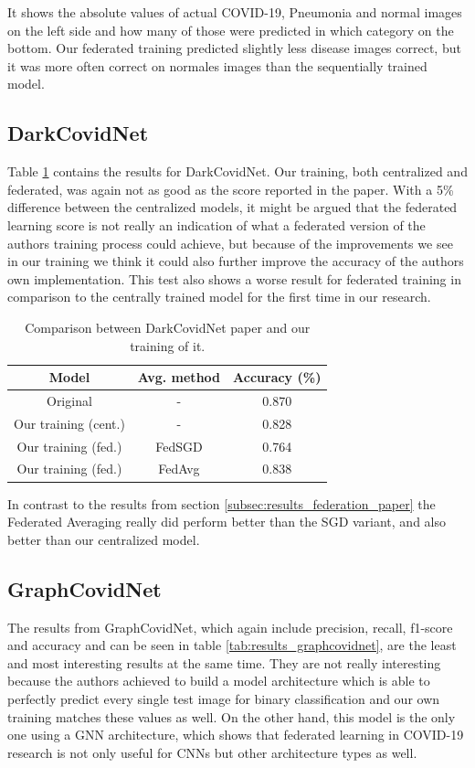 It shows the absolute values of actual COVID-19, Pneumonia and normal images on the left side and how many of those were predicted in which category on the bottom. Our federated training predicted slightly less disease images correct, but it was more often correct on normales images than the sequentially trained model.

\subsection{DarkCovidNet}
Table \ref{tab:results_darkcovidnet} contains the results for DarkCovidNet. Our training, both centralized and federated, was again not as good as the score reported in the paper. With a 5\% difference between the centralized models, it might be argued that the federated learning score is not really an indication of what a federated version of the authors training process could achieve, but because of the improvements we see in our training we think it could also further improve the accuracy of the authors own implementation. This test also shows a worse result for federated training in comparison to the centrally trained model for the first time in our research.

\begin{table}[htbp]
    \small
    \centering
    \caption{Comparison between DarkCovidNet paper\cite{dark_net} and our training of it.}
    \begin{tabular}{c|c|c}
        Model & Avg. method & Accuracy (\%)\\
        \hline
        Original & - & 0.870 \\
        Our training (cent.) & - & 0.828\\
        Our training (fed.) & FedSGD & 0.764 \\
        Our training (fed.) & FedAvg & 0.838 \\
    \end{tabular}
    \label{tab:results_darkcovidnet}
\end{table}

In contrast to the results from section \ref{subsec:results_federation_paper} the Federated Averaging really did perform better than the SGD variant, and also better than our centralized model.

\subsection{GraphCovidNet}
The results from GraphCovidNet, which again include precision, recall, f1-score and accuracy and can be seen in table \ref{tab:results_graphcovidnet}, are the least and most interesting results at the same time. They are not really interesting because the authors achieved to build a model architecture which is able to perfectly predict every single test image for binary classification and our own training matches these values as well. On the other hand, this model is the only one using a GNN architecture, which shows that federated learning in COVID-19 research is not only useful for CNNs but other architecture types as well.

